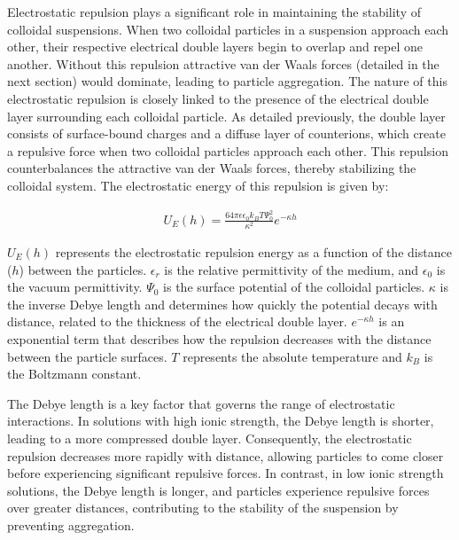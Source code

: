Electrostatic repulsion plays a significant role in maintaining the stability of colloidal suspensions. When two colloidal particles in a suspension approach each other, their respective electrical double layers begin to overlap and repel one another. Without this repulsion attractive van der Waals forces (detailed in the next section) would dominate, leading to particle aggregation. The nature of this electrostatic repulsion is closely linked to the presence of the electrical double layer surrounding each colloidal particle. As detailed previously, the double layer consists of surface-bound charges and a diffuse layer of counterions, which create a repulsive force when two colloidal particles approach each other. This repulsion counterbalances the attractive van der Waals forces, thereby stabilizing the colloidal system.\cite{hunter1989foundations} The electrostatic energy of this repulsion is given by:


\begin{equation} %
\begin{split}
U_E(h)= \frac{64 \pi \epsilon \epsilon_0 k_BT \Psi_0^2}{\kappa^2} e^{-\kappa h}
\end{split}
\end{equation}

\( U_E(h) \) represents the electrostatic repulsion energy as a function of the distance (\( h \)) between the particles. \( \epsilon_r \) is the relative permittivity of the medium, and \( \epsilon_0 \) is the vacuum permittivity. \( \Psi_0 \) is the surface potential of the colloidal particles. \( \kappa \) is the inverse Debye length and determines how quickly the potential decays with distance, related to the thickness of the electrical double layer. \( e^{-\kappa h} \) is an exponential term that describes how the repulsion decreases with the distance between the particle surfaces. $T$ represents the absolute temperature and $k_B$ is the Boltzmann constant. \cite{OHSHIMA200218} \cite{behrens2001charge}

The Debye length is a key factor that governs the range of electrostatic interactions. In solutions with high ionic strength, the Debye length is shorter, leading to a more compressed double layer. Consequently, the electrostatic repulsion decreases more rapidly with distance, allowing particles to come closer before experiencing significant repulsive forces. In contrast, in low ionic strength solutions, the Debye length is longer, and particles experience repulsive forces over greater distances, contributing to the stability of the suspension by preventing aggregation.

